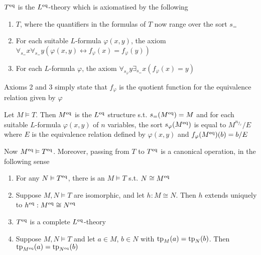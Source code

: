 \documentclass[11pt]{article}
\begin{document}
\begin{definition}[]
\(T^{\operatorname{eq}}\) is the \(L^{\operatorname{eq}}\)-theory which is axiomatised by the following
\begin{enumerate}
\item \(T\), where the quantifiers in the formulas of \(T\) now range over the sort \(s_=\)
\item For each suitable \(L\)-formula \(\varphi(x,y)\), the axiom \(\forall_{s_=}x\forall_{s_=}y(\varphi(x,y)\leftrightarrow f_\varphi(x)=f_\varphi(y))\)
\item For each \(L\)-formula \(\varphi\), the axiom \(\forall_{s_\varphi}y\exists_{s_=}x(f_\varphi(x)=y)\)
\end{enumerate}
\end{definition}

Axioms 2 and 3 simply state that \(f_\varphi\) is the quotient function for the equivalence relation
given by \(\varphi\)

\begin{definition}[]
Let \(M\vDash T\). Then \(M^{\operatorname{eq}}\) is the \(L^{\operatorname{eq}}\) structure s.t. \(s_=(M^{\operatorname{eq}})=M\) and for each
suitable \(L\)-formula \(\varphi(x,y)\) of \(n\) variables, the sort \(s_\varphi(M^{\operatorname{eq}})\) is equal
to \(M^{n_{f_\varphi}}/E\) where \(E\) is the equivalence relation defined by \(\varphi(x,y)\) and \(f_\varphi(M^{\operatorname{eq}})(b)=b/E\)
\end{definition}

Now \(M^{\operatorname{eq}}\vDash T^{\operatorname{eq}}\). Moreover, passing from \(T\) to \(T^{\operatorname{eq}}\) is a canonical operation,
in the following sense
\begin{lemma}[]
\begin{enumerate}
\item For any \(N\vDash T^{\operatorname{eq}}\), there is an \(M\vDash T\) s.t. \(N\cong M^{\operatorname{eq}}\)
\item Suppose \(M,N\vDash T\) are isomorphic, and let \(h:M\cong N\). Then \(h\) extends uniquely
to \(h^{\operatorname{eq}}:M^{\operatorname{eq}}\cong N^{\operatorname{eq}}\)
\item \(T^{\operatorname{eq}}\) is a complete \(L^{\operatorname{eq}}\)-theory
\item Suppose \(M,N\vDash T\) and let \(a\in M\), \(b\in N\) with \(\operatorname{tp}_M(a)=\operatorname{tp}_N(b)\). Then \(\operatorname{tp}_{M^{\operatorname{eq}}}(a)=\operatorname{tp}_{N^{\operatorname{eq}}}(b)\)
\end{enumerate}
\end{lemma}
\end{document}
